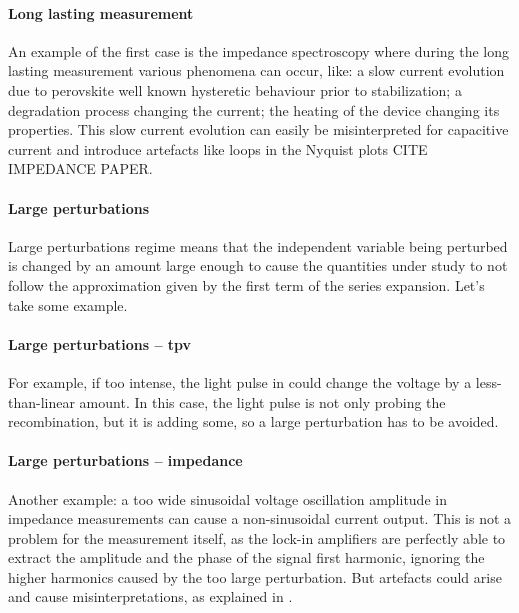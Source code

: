 		\paragraph{Long lasting measurement} An example of the first case is the impedance spectroscopy where during the long lasting measurement various phenomena can occur, like: a slow current evolution due to perovskite well known hysteretic behaviour prior to stabilization; a degradation process changing the current; the heating of the device changing its properties. This slow current evolution can easily be misinterpreted for capacitive current \cite{Jacobs2018} and introduce artefacts like loops in the Nyquist plots CITE IMPEDANCE PAPER.

		\paragraph{Large perturbations} Large perturbations regime means that the independent variable being perturbed is changed by an amount large enough to cause the quantities under study to not follow the approximation given by the first term of the series expansion. Let's take some example.

		\paragraph{Large perturbations -- \gls{tpv}} For example, if too intense, the light pulse in  could change the voltage by a less-than-linear amount. In this case, the light pulse is not only probing the recombination, but it is adding some, so a large perturbation has to be avoided.

		\paragraph{Large perturbations -- impedance} Another example: a too wide sinusoidal voltage oscillation amplitude in impedance measurements can cause a non-sinusoidal current output. This is not a problem for the measurement itself, as the lock-in amplifiers are perfectly able to extract the amplitude and the phase of the signal first harmonic, ignoring the higher harmonics caused by the too large perturbation. But artefacts could arise and cause misinterpretations, as explained in .

